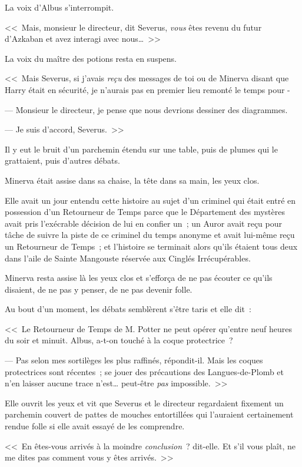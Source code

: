 La voix d'Albus s'interrompit.

<<~Mais, monsieur le directeur, dit Severus, \emph{vous} êtes revenu du futur d'Azkaban et avez interagi avec nous…~>>

La voix du maître des potions resta en suspens.

<<~Mais Severus, si j'avais \emph{reçu} des messages de toi ou de Minerva disant que Harry était en sécurité, je n'aurais pas en premier lieu remonté le temps pour -

--- Monsieur le directeur, je pense que nous devrions dessiner des diagrammes.

--- Je suis d'accord, Severus.~>>

Il y eut le bruit d'un parchemin étendu sur une table, puis de plumes qui le grattaient, puis d'autres débats.

Minerva était assise dans sa chaise, la tête dans sa main, les yeux clos.

Elle avait un jour entendu cette histoire au sujet d'un criminel qui était entré en possession d'un Retourneur de Temps parce que le Département des mystères avait pris l'exécrable décision de lui en confier un~; un Auror avait reçu pour tâche de suivre la piste de ce criminel du temps anonyme et avait lui-même reçu un Retourneur de Temps~; et l'histoire se terminait alors qu'ils étaient tous deux dans l'aile de Sainte Mangouste réservée aux Cinglés Irrécupérables.

Minerva resta assise là les yeux clos et s'efforça de ne pas écouter ce qu'ils disaient, de ne pas y penser, de ne pas devenir folle.

Au bout d'un moment, les débats semblèrent s'être taris et elle dit~:

<<~Le Retourneur de Temps de M. Potter ne peut opérer qu'entre neuf heures du soir et minuit. Albus, a-t-on touché à la coque protectrice~?

--- Pas selon mes sortilèges les plus raffinés, répondit-il. Mais les coques protectrices sont récentes~; se jouer des précautions des Langues-de-Plomb et n'en laisser aucune trace n'est… peut-être \emph{pas} impossible.~>>

Elle ouvrit les yeux et vit que Severus et le directeur regardaient fixement un parchemin couvert de pattes de mouches entortillées qui l'auraient certainement rendue folle si elle avait essayé de les comprendre.

<<~En êtes-vous arrivés à la moindre \emph{conclusion}~? dit-elle. Et s'il vous plaît, ne me dites pas comment vous y êtes arrivés.~>>


